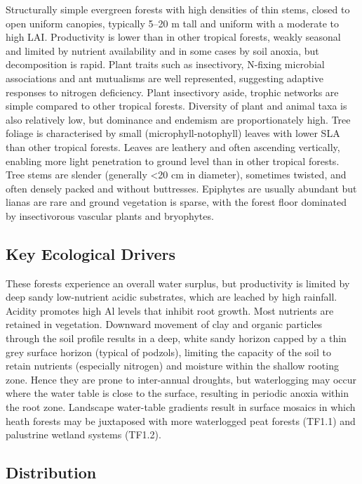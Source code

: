 \documentclass[
  letterpaper,
  DIV=11,
  numbers=noendperiod]{scrartcl}
\begin{document}
Structurally simple evergreen forests with high densities of thin stems,
closed to open uniform canopies, typically 5--20 m tall and uniform with
a moderate to high LAI. Productivity is lower than in other tropical
forests, weakly seasonal and limited by nutrient availability and in
some cases by soil anoxia, but decomposition is rapid. Plant traits such
as insectivory, N-fixing microbial associations and ant mutualisms are
well represented, suggesting adaptive responses to nitrogen deficiency.
Plant insectivory aside, trophic networks are simple compared to other
tropical forests. Diversity of plant and animal taxa is also relatively
low, but dominance and endemism are proportionately high. Tree foliage
is characterised by small (microphyll-notophyll) leaves with lower SLA
than other tropical forests. Leaves are leathery and often ascending
vertically, enabling more light penetration to ground level than in
other tropical forests. Tree stems are slender (generally \textless20 cm
in diameter), sometimes twisted, and often densely packed and without
buttresses. Epiphytes are usually abundant but lianas are rare and
ground vegetation is sparse, with the forest floor dominated by
insectivorous vascular plants and bryophytes.

\subsection{Key Ecological Drivers}\label{key-ecological-drivers-72}

These forests experience an overall water surplus, but productivity is
limited by deep sandy low-nutrient acidic substrates, which are leached
by high rainfall. Acidity promotes high Al levels that inhibit root
growth. Most nutrients are retained in vegetation. Downward movement of
clay and organic particles through the soil profile results in a deep,
white sandy horizon capped by a thin grey surface horizon (typical of
podzols), limiting the capacity of the soil to retain nutrients
(especially nitrogen) and moisture within the shallow rooting zone.
Hence they are prone to inter-annual droughts, but waterlogging may
occur where the water table is close to the surface, resulting in
periodic anoxia within the root zone. Landscape water-table gradients
result in surface mosaics in which heath forests may be juxtaposed with
more waterlogged peat forests (TF1.1) and palustrine wetland systems
(TF1.2).

\subsection{Distribution}\label{distribution-72}
\end{document}
